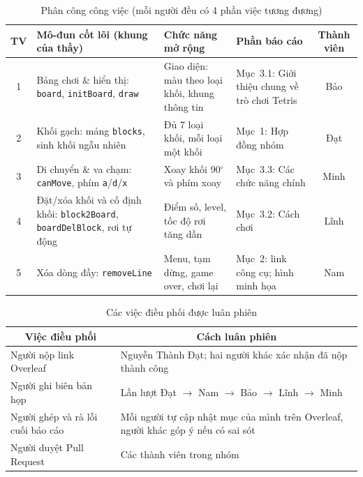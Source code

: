 \documentclass[a4paper]{article}
\begin{document}
\begin{table}[H]
\centering
\renewcommand{\tabularxcolumn}[1]{m{#1}}
\begin{tabularx}{\linewidth}{|c|>{\hsize=1.3\hsize\raggedright\arraybackslash}X|>{\hsize=0.85\hsize\raggedright\arraybackslash}X|>{\hsize=0.85\hsize\raggedright\arraybackslash}X|c|}
\hline
\textbf{TV} &
\centering\arraybackslash\textbf{Mô-đun cốt lõi (khung của thầy)} &
\centering\arraybackslash\textbf{Chức năng mở rộng} &
\centering\arraybackslash\textbf{Phần báo cáo} &
\textbf{Thành viên} \\ \hline
1 & Bảng chơi \& hiển thị: \texttt{board}, \texttt{initBoard}, \texttt{draw} & Giao diện: màu theo loại khối, khung thông tin & Mục~3.1: Giới thiệu chung về trò chơi Tetris & Bảo \\ \hline
2 & Khối gạch: mảng \texttt{blocks}, sinh khối ngẫu nhiên & Đủ 7 loại khối, mỗi loại một khối & Mục~1: Hợp đồng nhóm & Đạt \\ \hline
3 & Di chuyển \& va chạm: \texttt{canMove}, phím \texttt{a}/\texttt{d}/\texttt{x} & Xoay khối 90$^\circ$ và phím xoay & Mục~3.3: Các chức năng chính & Minh \\ \hline
4 & Đặt/xóa khối và cố định khối: \texttt{block2Board}, \texttt{boardDelBlock}, rơi tự động & Điểm số, level, tốc độ rơi tăng dần & Mục~3.2: Cách chơi & Lĩnh \\ \hline
5 & Xóa dòng đầy: \texttt{removeLine} & Menu, tạm dừng, game over, chơi lại & Mục~2: link công cụ; hình minh họa & Nam \\ \hline
\end{tabularx}
\vspace{8pt}
\caption{Phân công công việc (mỗi người đều có 4 phần việc tương đương)}
\label{tab:phancong}
\end{table}
\begin{table}[H]
\centering

\begin{tabularx}{\linewidth}{|p{4.8cm}|X|}
\hline
\multicolumn{1}{|c|}{\textbf{Việc điều phối}} & \multicolumn{1}{c|}{\textbf{Cách luân phiên}} \\ \hline
Người nộp link Overleaf & Nguyễn Thành Đạt; hai người khác xác nhận đã nộp thành công \\ \hline
Người ghi biên bản họp & Lần lượt Đạt $\to$ Nam $\to$ Bảo $\to$ Lĩnh $\to$ Minh \\ \hline
Người ghép và rà lỗi cuối báo cáo & Mỗi người tự cập nhật mục của mình trên Overleaf, người khác góp ý nếu có sai sót \\ \hline
Người duyệt Pull Request & Các thành viên trong nhóm \\ \hline
\end{tabularx}
\vspace{8pt}
\caption{Các việc điều phối được luân phiên}
\label{tab:luanphien}
\end{table}
\end{document}
